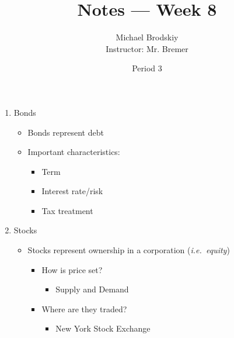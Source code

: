 \documentclass[12pt]{article}
\title{Notes — Week 8}
\date{Period 3}
\author{Michael Brodskiy\\ \small Instructor: Mr. Bremer}
\begin{document}
\maketitle

\begin{enumerate}

  \item Bonds

    \begin{itemize}

      \item Bonds represent debt

      \item Important characteristics:

        \begin{itemize}

          \item Term

          \item Interest rate/risk

          \item Tax treatment

        \end{itemize}

    \end{itemize}

  \item Stocks

    \begin{itemize}

      \item Stocks represent ownership in a corporation (\textit{i.e.\ equity})

        \begin{itemize}

          \item How is price set?

            \begin{itemize}

              \item Supply and Demand

            \end{itemize}

          \item Where are they traded?

            \begin{itemize}

              \item New York Stock Exchange


\end{itemize}
\end{itemize}
\end{itemize}
\end{enumerate}
\end{document}
